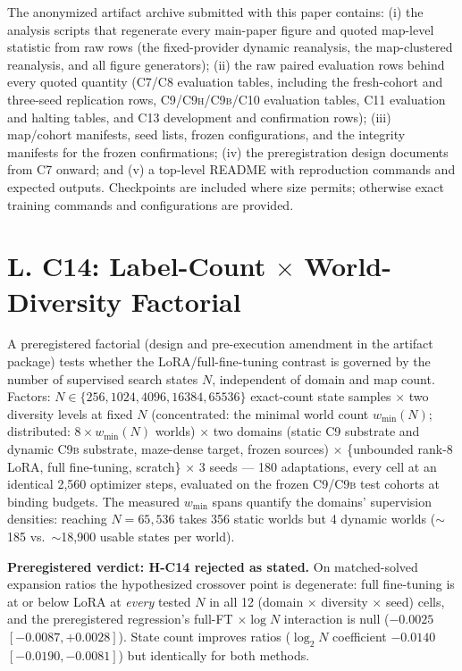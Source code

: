 \documentclass[letterpaper]{article} %
\newcommand{\stage}[1]{\textsc{#1}}
\begin{document}
The anonymized artifact archive submitted with this paper contains: (i) the analysis scripts that regenerate every main-paper figure and quoted map-level statistic from raw rows (the fixed-provider dynamic reanalysis, the map-clustered reanalysis, and all figure generators); (ii) the raw paired evaluation rows behind every quoted quantity (\stage{C7}/\stage{C8} evaluation tables, including the fresh-cohort and three-seed replication rows, \stage{C9}/\stage{C9h}/\stage{C9b}/\stage{C10} evaluation tables, \stage{C11} evaluation and halting tables, and \stage{C13} development and confirmation rows); (iii) map/cohort manifests, seed lists, frozen configurations, and the integrity manifests for the frozen confirmations; (iv) the preregistration design documents from \stage{C7} onward; and (v) a top-level README with reproduction commands and expected outputs. Checkpoints are included where size permits; otherwise exact training commands and configurations are provided.

\section{L. C14: Label-Count $\times$ World-Diversity Factorial}

A preregistered factorial (design and pre-execution amendment in the artifact package) tests whether the LoRA/full-fine-tuning contrast is governed by the number of supervised search states $N$, independent of domain and map count. Factors: $N \in \{256, 1024, 4096, 16384, 65536\}$ exact-count state samples $\times$ two diversity levels at fixed $N$ (concentrated: the minimal world count $w_{\min}(N)$; distributed: $8 \times w_{\min}(N)$ worlds) $\times$ two domains (static \stage{C9} substrate and dynamic \stage{C9b} substrate, maze-dense target, frozen sources) $\times$ \{unbounded rank-8 LoRA, full fine-tuning, scratch\} $\times$ 3 seeds --- 180 adaptations, every cell at an identical 2{,}560 optimizer steps, evaluated on the frozen \stage{C9}/\stage{C9b} test cohorts at binding budgets. The measured $w_{\min}$ spans quantify the domains' supervision densities: reaching $N{=}65{,}536$ takes 356 static worlds but 4 dynamic worlds ($\sim$185 vs.\ $\sim$18{,}900 usable states per world).

\textbf{Preregistered verdict: H-C14 rejected as stated.} On matched-solved expansion ratios the hypothesized crossover point is degenerate: full fine-tuning is at or below LoRA at \emph{every} tested $N$ in all 12 (domain $\times$ diversity $\times$ seed) cells, and the preregistered regression's full-FT $\times \log N$ interaction is null ($-0.0025$ $[-0.0087, +0.0028]$). State count improves ratios ($\log_2 N$ coefficient $-0.0140$ $[-0.0190, -0.0081]$) but identically for both methods.
\end{document}
